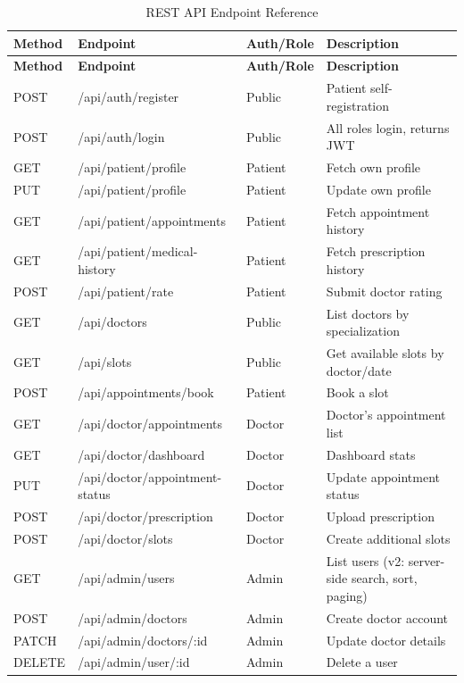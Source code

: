 \begin{longtable}{|L{1.9cm}|L{5.4cm}|L{2.1cm}|L{3.8cm}|}
\caption{REST API Endpoint Reference} \label{tab:api} \\
\hline
\textbf{Method} & \textbf{Endpoint} & \textbf{Auth/Role} & \textbf{Description} \\
\hline
\endfirsthead
\hline
\textbf{Method} & \textbf{Endpoint} & \textbf{Auth/Role} & \textbf{Description} \\
\hline
\endhead
POST & /api/auth/register & Public & Patient self-registration \\
\hline
POST & /api/auth/login & Public & All roles login, returns JWT \\
\hline
GET & /api/patient/profile & Patient & Fetch own profile \\
\hline
PUT & /api/patient/profile & Patient & Update own profile \\
\hline
GET & /api/patient/appointments & Patient & Fetch appointment history \\
\hline
GET & /api/patient/medical-history & Patient & Fetch prescription history \\
\hline
POST & /api/patient/rate & Patient & Submit doctor rating \\
\hline
GET & /api/doctors & Public & List doctors by specialization \\
\hline
GET & /api/slots & Public & Get available slots by doctor/date \\
\hline
POST & /api/appointments/book & Patient & Book a slot \\
\hline
GET & /api/doctor/appointments & Doctor & Doctor's appointment list \\
\hline
GET & /api/doctor/dashboard & Doctor & Dashboard stats \\
\hline
PUT & /api/doctor/appointment-status & Doctor & Update appointment status \\
\hline
POST & /api/doctor/prescription & Doctor & Upload prescription \\
\hline
POST & /api/doctor/slots & Doctor & Create additional slots \\
\hline
GET & /api/admin/users & Admin & List users (v2: server-side search, sort, paging) \\
\hline
POST & /api/admin/doctors & Admin & Create doctor account \\
\hline
PATCH & /api/admin/doctors/:id & Admin & Update doctor details \\
\hline
DELETE & /api/admin/user/:id & Admin & Delete a user \\

\end{longtable}
